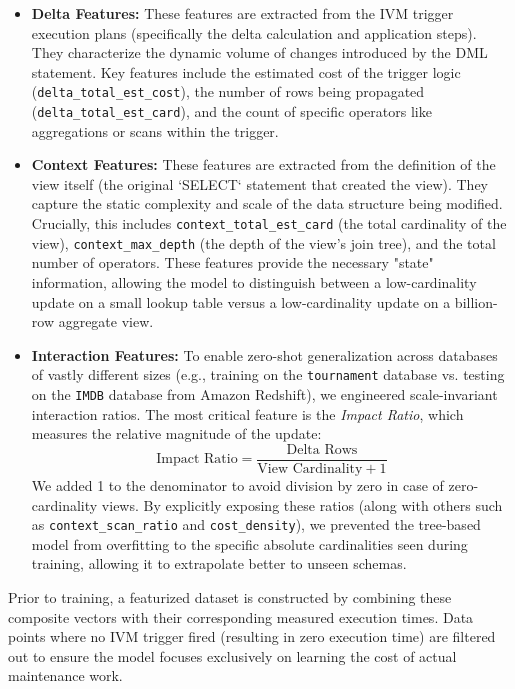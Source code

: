 \begin{itemize}
    \item \textbf{Delta Features:} These features are extracted from the \ac{IVM} trigger execution plans (specifically the delta calculation and application steps). They characterize the dynamic volume of changes introduced by the \ac{DML} statement. Key features include the estimated cost of the trigger logic (\texttt{delta\_total\_est\_cost}), the number of rows being propagated (\texttt{delta\_total\_est\_card}), and the count of specific operators like aggregations or scans within the trigger.
    
    \item \textbf{Context Features:} These features are extracted from the definition of the view itself (the original `SELECT` statement that created the view). They capture the static complexity and scale of the data structure being modified. Crucially, this includes \texttt{context\_total\_est\_card} (the total cardinality of the view), \texttt{context\_max\_depth} (the depth of the view's join tree), and the total number of operators. These features provide the necessary "state" information, allowing the model to distinguish between a low-cardinality update on a small lookup table versus a low-cardinality update on a billion-row aggregate view.
    
    \item \textbf{Interaction Features:} To enable zero-shot generalization across databases of vastly different sizes (e.g., training on the \texttt{tournament} database vs. testing on the \texttt{IMDB} database from Amazon Redshift), we engineered scale-invariant interaction ratios. The most critical feature is the \textit{Impact Ratio}, which measures the relative magnitude of the update:
    \[
    \text{Impact Ratio} = \frac{\text{Delta Rows}}{\text{View Cardinality} + 1}
    \]
    We added 1 to the denominator to avoid division by zero in case of zero-cardinality views. By explicitly exposing these ratios (along with others such as \texttt{context\_scan\_ratio} and \texttt{cost\_density}), we prevented the tree-based model from overfitting to the specific absolute cardinalities seen during training, allowing it to extrapolate better to unseen schemas.
\end{itemize}

Prior to training, a featurized dataset is constructed by combining these composite vectors with their corresponding measured execution times. Data points where no \ac{IVM} trigger fired (resulting in zero execution time) are filtered out to ensure the model focuses exclusively on learning the cost of actual maintenance work.

